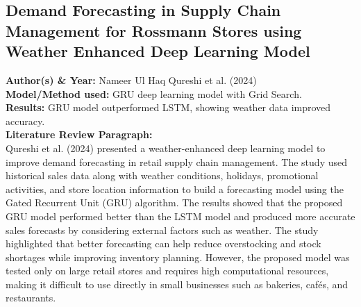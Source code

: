 \documentclass[conference]{IEEEtran}
\begin{document}
\subsection{Demand Forecasting in Supply Chain Management for Rossmann Stores using Weather Enhanced Deep Learning Model}
\textbf{Author(s) \& Year:} Nameer Ul Haq Qureshi et al. (2024)\\
\textbf{Model/Method used:} GRU deep learning model with Grid Search.\\
\textbf{Results:} GRU model outperformed LSTM, showing weather data improved accuracy.\\
\textbf{Literature Review Paragraph:}\\
Qureshi et al. (2024) presented a weather-enhanced deep learning model to improve demand forecasting in retail supply chain management. The study used historical sales data along with weather conditions, holidays, promotional activities, and store location information to build a forecasting model using the Gated Recurrent Unit (GRU) algorithm. The results showed that the proposed GRU model performed better than the LSTM model and produced more accurate sales forecasts by considering external factors such as weather. The study highlighted that better forecasting can help reduce overstocking and stock shortages while improving inventory planning. However, the proposed model was tested only on large retail stores and requires high computational resources, making it difficult to use directly in small businesses such as bakeries, cafés, and restaurants.
\end{document}
